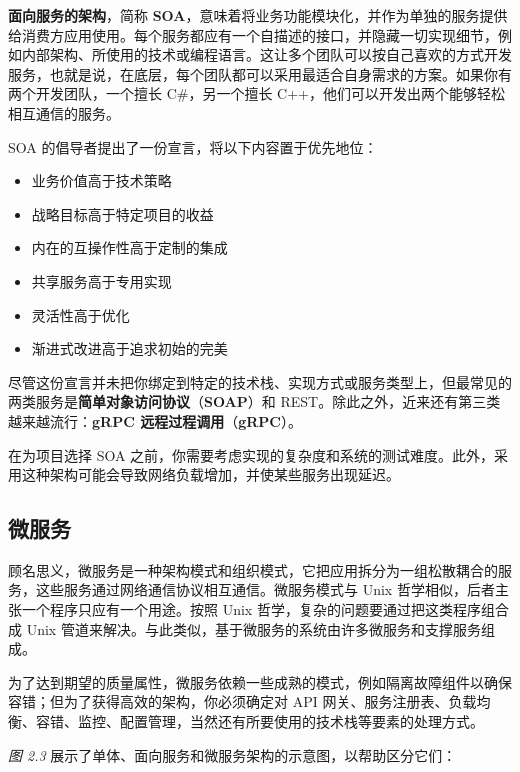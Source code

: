 \label{idx:094}
\textbf{面向服务的架构}，简称 \textbf{SOA}，意味着将业务功能模块化，并作为单独的服务提供给消费方应用使用。每个服务都应有一个自描述的接口，并隐藏一切实现细节，例如内部架构、所使用的技术或编程语言。这让多个团队可以按自己喜欢的方式开发服务，也就是说，在底层，每个团队都可以采用最适合自身需求的方案。如果你有两个开发团队，一个擅长 C\#，另一个擅长 C++，他们可以开发出两个能够轻松相互通信的服务。

\label{idx:095}
SOA 的倡导者提出了一份宣言，将以下内容置于优先地位：

\begin{itemize}
\item 业务价值高于技术策略
\item 战略目标高于特定项目的收益
\item 内在的互操作性高于定制的集成
\item 共享服务高于专用实现
\item 灵活性高于优化
\item 渐进式改进高于追求初始的完美
\end{itemize}

\label{idx:096}
\label{idx:097}
尽管这份宣言并未把你绑定到特定的技术栈、实现方式或服务类型上，但最常见的两类服务是\textbf{简单对象访问协议}（\textbf{SOAP}）和 REST。除此之外，近来还有第三类越来越流行：\textbf{gRPC 远程过程调用}（\textbf{gRPC}）。

在为项目选择 SOA 之前，你需要考虑实现的复杂度和系统的测试难度。此外，采用这种架构可能会导致网络负载增加，并使某些服务出现延迟。

\subsection{微服务}

\label{idx:098}
顾名思义，微服务是一种架构模式和组织模式，它把应用拆分为一组松散耦合的服务，这些服务通过网络通信协议相互通信。微服务模式与 Unix 哲学相似，后者主张一个程序只应有一个用途。按照 Unix 哲学，复杂的问题要通过把这类程序组合成 Unix 管道来解决。与此类似，基于微服务的系统由许多微服务和支撑服务组成。

为了达到期望的质量属性，微服务依赖一些成熟的模式，例如隔离故障组件以确保容错；但为了获得高效的架构，你必须确定对 API 网关、服务注册表、负载均衡、容错、监控、配置管理，当然还有所要使用的技术栈等要素的处理方式。

\emph{图 2.3} 展示了单体、面向服务和微服务架构的示意图，以帮助区分它们：


